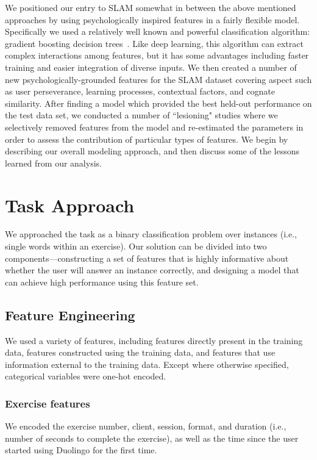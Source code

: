 \documentclass[11pt,a4paper]{article}
\begin{document}
We positioned our entry to SLAM somewhat in between the above mentioned approaches by using 
psychologically inspired features in a fairly flexible model. 
Specifically we used a relatively well known and powerful classification
algorithm: gradient boosting decision trees~\cite[GBDT][]{ke2017lightgbm}.  Like
deep learning, this algorithm can extract complex interactions among features,
but it has some advantages including faster training and easier integration of
diverse inputs. We then created a number of new psychologically-grounded features for the SLAM
dataset covering aspect such as user perseverance, learning processes, 
contextual factors, and cognate similarity.  After finding a model which provided the best
held-out performance on the test data set, we conducted a number of ``lesioning" studies where
we selectively removed features from the model and re-estimated the parameters in order
to assess the contribution of particular types of features.  We begin by describing our 
overall modeling approach, and then discuss some of the lessons learned from our analysis.


\section{Task Approach}

We approached the task as a binary classification problem over instances (i.e.,
single words within an exercise). Our solution can be divided into two
components---constructing a set of features that is highly informative about
whether the user will answer an instance correctly, and designing a model that
can achieve high performance using this feature set.

\subsection{Feature Engineering}

We used a variety of features, including features directly present in the
training data, features constructed using the training data, and features that
use information external to the training data. Except where otherwise specified,
categorical variables were one-hot encoded.

\subsubsection{Exercise features}

We encoded the exercise number, client, session, format, and duration (i.e., number of
seconds to complete the exercise), as well as the time since the user started using Duolingo for the first time.
\end{document}
